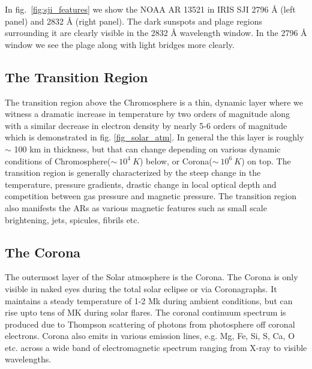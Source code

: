 In fig.~\ref{fig:sji_features} we show the NOAA AR 13521 in IRIS SJI 2796 {\AA} (left panel) and 2832 {\AA} (right panel). The dark sunspots and plage regions surrounding it are clearly visible in the 2832 {\AA} wavelength window. In the 2796 {\AA} window we see the plage along with light bridges more clearly. 

\subsection{The Transition Region}\label{transition-region}

The transition region above the Chromosphere is a thin, dynamic layer where we witness a dramatic increase in temperature by two orders of magnitude along with a similar decrease in electron density by nearly 5-6 orders of magnitude which is demonstrated in fig. \ref{fig_solar_atm}. In general the this layer is roughly $\sim$ 100 km in thickness, but that can change depending on various dynamic conditions of Chromosphere($\sim~10^{4}~K$) below, or Corona($\sim~10^{6}~K$) on top. The transition region is generally characterized by the steep change in the temperature, pressure gradients, drastic change in local optical depth and competition between gas pressure and magnetic pressure. The transition region also manifests the ARs as various magnetic features such as small scale brightening, jets, spicules, fibrils etc. 

\subsection{The Corona}\label{corona}

The outermost layer of the Solar atmosphere is the Corona. The Corona is only visible in naked eyes during the total solar eclipse or via Coronagraphs. It maintains a steady temperature of 1-2 Mk during ambient conditions, but can rise upto tens of MK during solar flares. The coronal continuum spectrum is produced due to Thompson scattering of photons from photosphere off coronal electrons. Corona also emits in various emission lines, e.g. Mg, Fe, Si, S, Ca, O etc. across a wide band of electromagnetic spectrum ranging from X-ray to visible wavelengths. 

